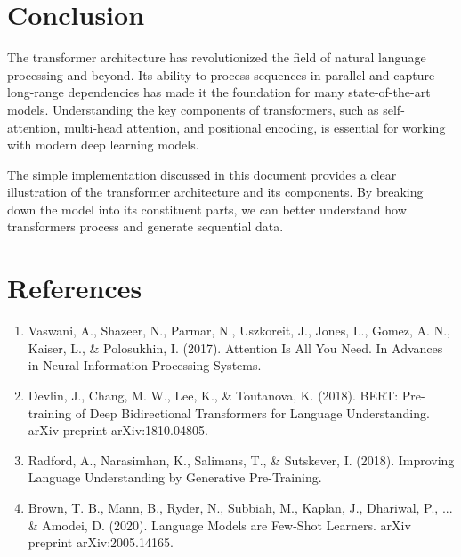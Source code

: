 \documentclass{article}
\begin{document}
\section{Conclusion}

The transformer architecture has revolutionized the field of natural language processing and beyond. Its ability to process sequences in parallel and capture long-range dependencies has made it the foundation for many state-of-the-art models. Understanding the key components of transformers, such as self-attention, multi-head attention, and positional encoding, is essential for working with modern deep learning models.

The simple implementation discussed in this document provides a clear illustration of the transformer architecture and its components. By breaking down the model into its constituent parts, we can better understand how transformers process and generate sequential data.

\section{References}

\begin{enumerate}
    \item Vaswani, A., Shazeer, N., Parmar, N., Uszkoreit, J., Jones, L., Gomez, A. N., Kaiser, L., \& Polosukhin, I. (2017). Attention Is All You Need. In Advances in Neural Information Processing Systems.
    \item Devlin, J., Chang, M. W., Lee, K., \& Toutanova, K. (2018). BERT: Pre-training of Deep Bidirectional Transformers for Language Understanding. arXiv preprint arXiv:1810.04805.
    \item Radford, A., Narasimhan, K., Salimans, T., \& Sutskever, I. (2018). Improving Language Understanding by Generative Pre-Training.
    \item Brown, T. B., Mann, B., Ryder, N., Subbiah, M., Kaplan, J., Dhariwal, P., ... \& Amodei, D. (2020). Language Models are Few-Shot Learners. arXiv preprint arXiv:2005.14165.
\end{enumerate}
\end{document}
